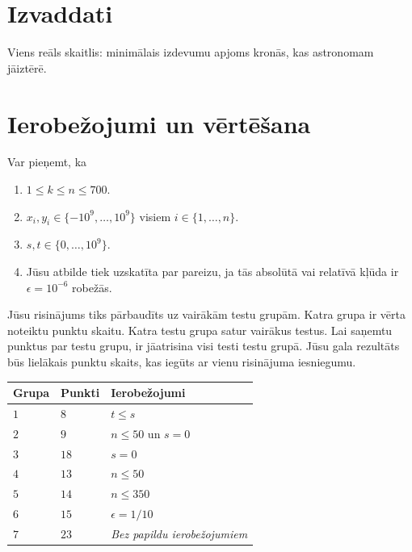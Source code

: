 \section*{Izvaddati}

Viens reāls skaitlis: minimālais izdevumu apjoms kronās, kas astronomam jāiztērē.

\section*{Ierobežojumi un vērtēšana}

Var pieņemt, ka
\begin{enumerate}
\item $1\leq k\leq n\leq 700$. %
\item $x_i, y_i\in \{-10^9,\ldots, 10^9\}$ visiem $i\in\{1,\ldots,n\}$. %
\item $s,t\in \{0,\ldots, 10^9\}$. %
\item Jūsu atbilde tiek uzskatīta par pareizu, ja tās absolūtā vai relatīvā kļūda ir $\epsilon = 10^{-6}$ robežās.
\end{enumerate}

Jūsu risinājums tiks pārbaudīts uz vairākām testu grupām. Katra grupa ir vērta noteiktu punktu skaitu.
Katra testu grupa satur vairākus testus.
Lai saņemtu punktus par testu grupu, ir jāatrisina visi testi testu grupā.
Jūsu gala rezultāts būs lielākais punktu skaits, kas iegūts ar vienu risinājuma iesniegumu.

\medskip
\noindent
\begin{tabular}{lll}
  Grupa & Punkti & Ierobežojumi\\\hline
  $1$ & $8$ &  $t\leq s$\\
  $2$ & $9$ & $n\le 50$ un $s=0$\\
  $3$ & $18$ & $s=0$\\
  $4$ & $13$ & $n\leq 50$\\
  $5$ & $14$ & $n\leq 350$\\
  $6$ & $15$ & $\epsilon = 1/10$\\
  $7$ & $23$ & \emph{Bez papildu ierobežojumiem}\\
\end{tabular}
